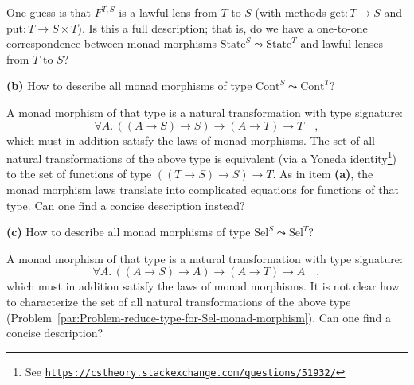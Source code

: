 One guess is that $F^{T,S}$ is a lawful lens from $T$ to $S$ (with
methods $\text{get}:T\rightarrow S$ and $\text{put}:T\rightarrow S\times T$).
Is this a full description; that is, do we have a one-to-one correspondence
between monad morphisms $\text{State}^{S}\leadsto\text{State}^{T}$
and lawful lenses from $T$ to $S$?

\textbf{(b)} How to describe all monad morphisms of type $\text{Cont}^{S}\leadsto\text{Cont}^{T}$?

A monad morphism of that type is a natural transformation with type
signature:
\[
\forall A.\,((A\rightarrow S)\rightarrow S)\rightarrow(A\rightarrow T)\rightarrow T\quad,
\]
which must in addition satisfy the laws of monad morphisms. The set
of all natural transformations of the above type is equivalent (via
a Yoneda identity\footnote{See \texttt{\href{https://cstheory.stackexchange.com/questions/51932/}{https://cstheory.stackexchange.com/questions/51932/}}})
to the set of functions of type $((T\rightarrow S)\rightarrow S)\rightarrow T$.
As in item \textbf{(a)}, the monad morphism laws translate into complicated
equations for functions of that type. Can one find a concise description
instead?

\textbf{(c)} How to describe all monad morphisms of type $\text{Sel}^{S}\leadsto\text{Sel}^{T}$?

A monad morphism of that type is a natural transformation with type
signature:
\[
\forall A.\,((A\rightarrow S)\rightarrow A)\rightarrow(A\rightarrow T)\rightarrow A\quad,
\]
which must in addition satisfy the laws of monad morphisms. It is
not clear how to characterize the set of all natural transformations
of the above type (Problem~\ref{par:Problem-reduce-type-for-Sel-monad-morphism}).
Can one find a concise description?
